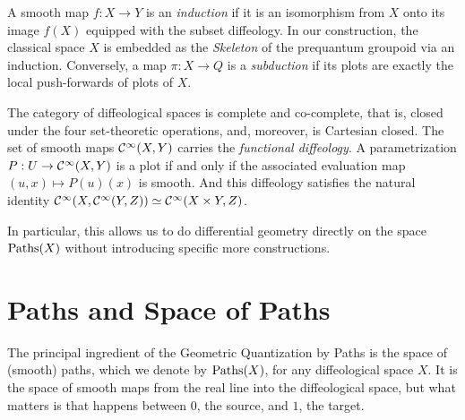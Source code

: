 \documentclass[10pt,reqno,letterpaper,twoside]{amsbook}
\begin{document}
  \begin{article}
    A smooth map $f: X \to Y$ is an \emph{induction} if it is an isomorphism from $X$ onto its image $f(X)$ equipped with the subset diffeology.
    In our construction,
    the classical space $X$ is embedded as the \emph{Skeleton} of the prequantum groupoid via an induction.
    Conversely,
    a map $\pi: X \to Q$ is a \emph{subduction} if its plots are exactly the local push-forwards of plots of $X$.
  \end{article}
  
  \begin{article}
    \label{subsec:Functional Diffeology}
    The category of diffeological spaces is complete and co-complete,
    that is,
    closed under the four set-theoretic operations,
    and,
    moreover,
    is Cartesian closed.
    The set of smooth maps ${\mathcal{C}}^\infty(X, Y)$ carries the \emph{functional diffeology}.
    A parametrization $P: U \to {\mathcal{C}}^\infty(X, Y)$ is a plot if and only if the associated evaluation map $(u, x) \mapsto P(u)(x)$ is smooth.
    And this diffeology satisfies the natural identity ${\mathcal{C}}^\infty(X,{\mathcal{C}}^\infty(Y,Z)) \simeq {\mathcal{C}}^\infty(X \times Y,Z)$.
    
    In particular,
    this allows us to do differential geometry directly on the space $\operatorname{Paths}(X)$ without introducing specific more constructions.
  \end{article}
  
  \section{Paths and Space of Paths}
  \label{sec:Paths and Space of Paths}
  
  The principal ingredient of the Geometric Quantization by Paths is the space of (smooth) paths,
  which we denote by $\operatorname{Paths}(X)$,
  for any diffeological space $X$.
  It is the space of smooth maps from the real line into the diffeological space,
  but what matters is that happens between $0$,
  the source,
  and $1$,
  the target.
  
\end{document}
